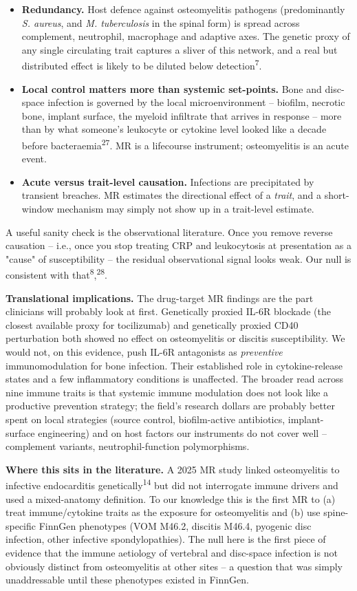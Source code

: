 \documentclass[11pt]{article}
\begin{document}
\begin{itemize}
\item \textbf{Redundancy.} Host defence against osteomyelitis pathogens (predominantly \emph{S. aureus}, and \emph{M. tuberculosis} in the spinal form) is spread across complement, neutrophil, macrophage and adaptive axes. The genetic proxy of any single circulating trait captures a sliver of this network, and a real but distributed effect is likely to be diluted below detection\textsuperscript{7}.
\item \textbf{Local control matters more than systemic set-points.} Bone and disc-space infection is governed by the local microenvironment -- biofilm, necrotic bone, implant surface, the myeloid infiltrate that arrives in response -- more than by what someone's leukocyte or cytokine level looked like a decade before bacteraemia\textsuperscript{27}. MR is a lifecourse instrument; osteomyelitis is an acute event.
\item \textbf{Acute versus trait-level causation.} Infections are precipitated by transient breaches. MR estimates the directional effect of a \emph{trait}, and a short-window mechanism may simply not show up in a trait-level estimate.
\end{itemize}
A useful sanity check is the observational literature. Once you remove reverse causation -- i.e., once you stop treating CRP and leukocytosis at presentation as a "cause" of susceptibility -- the residual observational signal looks weak. Our null is consistent with that\textsuperscript{8},\textsuperscript{28}.

\textbf{Translational implications.} The drug-target MR findings are the part clinicians will probably look at first. Genetically proxied IL-6R blockade (the closest available proxy for tocilizumab) and genetically proxied CD40 perturbation both showed no effect on osteomyelitis or discitis susceptibility. We would not, on this evidence, push IL-6R antagonists as \emph{preventive} immunomodulation for bone infection. Their established role in cytokine-release states and a few inflammatory conditions is unaffected. The broader read across nine immune traits is that systemic immune modulation does not look like a productive prevention strategy; the field's research dollars are probably better spent on local strategies (source control, biofilm-active antibiotics, implant-surface engineering) and on host factors our instruments do not cover well -- complement variants, neutrophil-function polymorphisms.

\textbf{Where this sits in the literature.} A 2025 MR study linked osteomyelitis to infective endocarditis genetically\textsuperscript{14} but did not interrogate immune drivers and used a mixed-anatomy definition. To our knowledge this is the first MR to (a) treat immune/cytokine traits as the exposure for osteomyelitis and (b) use spine-specific FinnGen phenotypes (VOM M46.2, discitis M46.4, pyogenic disc infection, other infective spondylopathies). The null here is the first piece of evidence that the immune aetiology of vertebral and disc-space infection is not obviously distinct from osteomyelitis at other sites -- a question that was simply unaddressable until these phenotypes existed in FinnGen.
\end{document}
